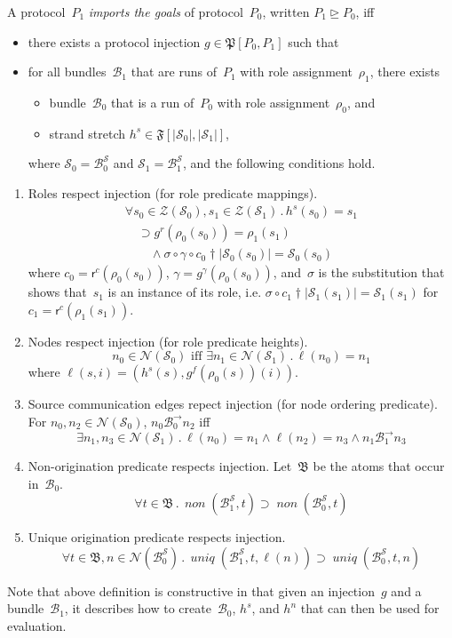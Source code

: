 \documentclass[12pt]{article}
\newcommand{\fn}[1]{\ensuremath{\operatorname{\mathit{#1}}}}
\newcommand{\prefix}[2]{#1\dagger#2}
\newcommand{\all}[1]{\forall#1\mathpunct.}
\newcommand{\some}[1]{\exists#1\mathpunct.}
\newcommand{\alg}[1]{\ensuremath{\mathfrak{#1}}}
\newcommand{\atm}{\alg{B}}
\newcommand{\ssp}{\ensuremath{\mathcal{S}}}
\newcommand{\bun}{\ensuremath{\mathcal{B}}}
\newcommand{\strands}{\ensuremath{\mathcal{Z}}}
\newcommand{\nodes}{\ensuremath{\mathcal{N}}}
\newcommand{\rl}{\ensuremath{\rho}}
\newcommand{\role}{\mathsf{r}}
\begin{document}
A protocol~$P_1$ \emph{imports the goals} of protocol~$P_0$, written
$P_1\unrhd P_0$, iff
\begin{itemize}
\item there exists a protocol injection $g\in\alg{P}[P_0,P_1]$ such
  that
\item for all bundles~$\bun_1$ that are runs of~$P_1$ with role
  assignment~$\rl_1$, there exists
  \begin{itemize}
  \item bundle~$\bun_0$ that is a run of~$P_0$ with role
    assignment~$\rl_0$, and
  \item strand stretch $h^s\in\alg{F}[|\ssp_0|, |\ssp_1|]$,
  \end{itemize}
  where $\ssp_0=\bun^\ssp_0$ and $\ssp_1=\bun^\ssp_1$, and the following
  conditions hold.
\end{itemize}
\begin{enumerate}

\item\label{item: role mappings} Roles respect injection (for role
  predicate mappings).
  \[\begin{array}{l}
  \all{s_0\in\strands(\ssp_0),s_1\in\strands(\ssp_1)}h^s(s_0) = s_1\\
  \quad\supset g^r(\rl_0(s_0))=\rl_1(s_1)\\
  \qquad{}\land\sigma\circ\gamma\circ\prefix{c_0}{|\ssp_0(s_0)|}
  = \ssp_0(s_0)
  \end{array}\]
  where $c_0=\role^c(\rl_0(s_0))$,
  $\gamma=g^\gamma(\rl_0(s_0))$, and~$\sigma$ is the substitution that
  shows that~$s_1$ is an instance of its role, i.e.\@
  $\sigma\circ\prefix{c_1}{|\ssp_1(s_1)|}=\ssp_1(s_1)$ for
  $c_1=\role^c(\rl_1(s_1))$.

\item\label{item: role heights} Nodes respect injection (for role
  predicate heights).
  \[n_0\in\nodes(\ssp_0)\mbox{ iff }\some{n_1\in\nodes(\ssp_1)}\ell(n_0)=n_1\]
  where $\ell(s,i)=(h^s(s),g^f(\rl_0(s))(i))$.

\item\label{item: node orderings} Source communication edges repect
  injection (for node ordering predicate).  For
  $n_0,n_2\in\nodes(\ssp_0)$, $n_0\mathbin{\bun^\to_0} n_2$ iff
  \[\some{n_1,n_3\in\nodes(\ssp_1)}\ell(n_0)=n_1\land\ell(n_2)=n_3\land
  n_1\mathbin{\bun^\to_1} n_3\]

\item\label{item: nons} Non-origination predicate respects injection.
  Let~$\atm$ be the atoms that occur in~$\bun_0$.
  \[\all{t\in\atm}\fn{non}(\bun_1^\ssp, t)\supset\fn{non}(\bun_0^\ssp, t)\]

\item\label{item: uniques} Unique origination predicate respects injection.
  \[\all{t\in\atm,n\in\nodes(\bun_0^\ssp)}\fn{uniq}(\bun_1^\ssp,
  t,\ell(n))\supset\fn{uniq}(\bun_0^\ssp, t,n)\]
\end{enumerate}

Note that above definition is constructive in that given an
injection~$g$ and a bundle~$\bun_1$, it describes how to
create~$\bun_0$, $h^s$, and $h^n$ that can then be used for
evaluation.



\end{document}
